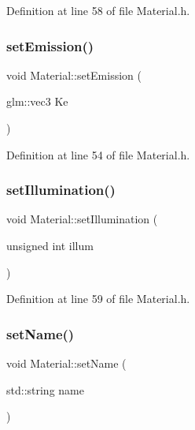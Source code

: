 Definition at line 58 of file Material.\+h.

\mbox{\label{class_material_a82a92812bac1ee728bd11816cb3217f5}} 
\subsubsection{\texorpdfstring{set\+Emission()}{setEmission()}}
{\footnotesize\ttfamily void Material\+::set\+Emission (\begin{DoxyParamCaption}\item[{glm\+::vec3}]{Ke }\end{DoxyParamCaption})\hspace{0.3cm}{\ttfamily [inline]}}



Definition at line 54 of file Material.\+h.

\mbox{\label{class_material_ae5fc41aae479cbae2b85c9f581759767}} 
\subsubsection{\texorpdfstring{set\+Illumination()}{setIllumination()}}
{\footnotesize\ttfamily void Material\+::set\+Illumination (\begin{DoxyParamCaption}\item[{unsigned int}]{illum }\end{DoxyParamCaption})\hspace{0.3cm}{\ttfamily [inline]}}



Definition at line 59 of file Material.\+h.

\mbox{\label{class_material_a8d3228e94c92ffffc1c5a9504ee5fd90}} 
\subsubsection{\texorpdfstring{set\+Name()}{setName()}}
{\footnotesize\ttfamily void Material\+::set\+Name (\begin{DoxyParamCaption}\item[{std\+::string}]{name }\end{DoxyParamCaption})\hspace{0.3cm}{\ttfamily [inline]}}



